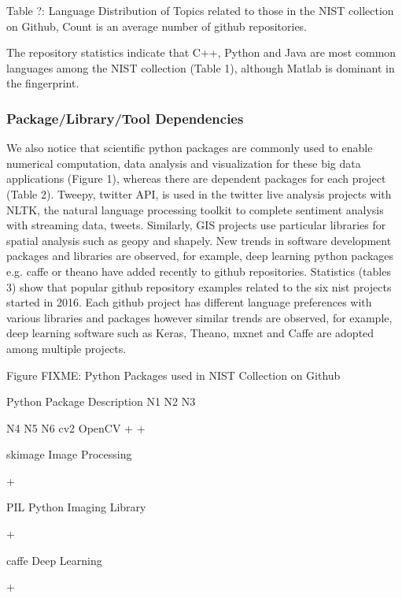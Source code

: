 \documentclass[9pt,twocolumn,twoside]{styles/osajnl}
\begin{document}
	Table ?:  Language Distribution of Topics related to those in the NIST collection on Github, Count is an average number of github repositories.


        The repository statistics indicate that C++, Python and Java
        are most common languages among the NIST collection (Table 1),
        although Matlab is dominant in the fingerprint.


\subsubsection{Package/Library/Tool Dependencies}

We also notice that scientific python packages are commonly used to
enable numerical computation, data analysis and visualization for
these big data applications (Figure 1), whereas there are dependent
packages for each project (Table 2). Tweepy, twitter API, is used in
the twitter live analysis projects with NLTK, the natural language
processing toolkit to complete sentiment analysis with streaming data,
tweets. Similarly, GIS projects use particular libraries for spatial
analysis such as geopy and shapely. New trends in software development
packages and libraries are observed, for example, deep learning python
packages e.g. caffe or theano have added recently to github
repositories. Statistics (tables 3) show that popular github
repository examples related to the six nist projects started in
2016. Each github project has different language preferences with
various libraries and packages however similar trends are observed,
for example, deep learning software such as Keras, Theano, mxnet and
Caffe are adopted among multiple projects.



  

Figure FIXME: Python Packages used in NIST Collection on Github

Python Package
	Description
	N1
	N2
	N3

	N4
	N5
	N6
	cv2
	OpenCV
	+
	+
	 
	 
	 
	 
	skimage
	Image Processing
	 
	+
	 
	 
	 
	 
	PIL
	Python Imaging Library
	 
	+
	 
	 
	 
	 
	caffe
	Deep Learning
	 
	+
	 
\end{document}
